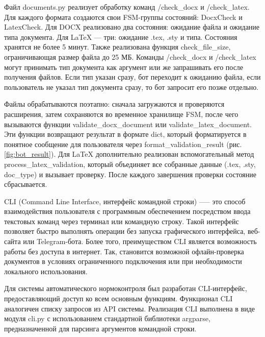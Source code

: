 \documentclass{report}
\begin{document}
Файл documents.py реализует обработку команд /check\_docx и /check\_latex. Для каждого формата создаются свои FSM-группы состояний: DocxCheck и LatexCheck. Для DOCX реализовано два состояния: ожидание файла и ожидание типа документа. Для LaTeX — три: ожидание .tex, .sty и типа. Состояния хранятся не более 5 минут. Также реализована функция check\_file\_size, ограничивающая размер файла до 25 МБ. Команды /check\_docx и /check\_latex могут принимать тип документа как аргумент или же запрашивать его после получения файлов. Если тип указан сразу, бот переходит к ожиданию файла, если пользователь не указал тип документа сразу, то бот запросит его позже отдельно.

Файлы обрабатываются поэтапно: сначала загружаются и проверяются расширения, затем сохраняются во временное хранилище FSM, после чего вызываются функции validate\_docx\_document или validate\_latex\_document. Эти функции возвращают результат в формате dict, который форматируется в понятное сообщение для пользователя через format\_validation\_result (рис. \ref{fig:bot_result}). Для LaTeX дополнительно реализован вспомогательный метод process\_latex\_validation, который объединяет все собранные данные (.tex, .sty, doc\_type) и вызывает проверку. После каждого завершения проверки состояние сбрасывается.



CLI (Command Line Interface, интерфейс командной строки) —-- это способ взаимодействия пользователя с программным обеспечением посредством ввода текстовых команд через терминал или командную строку. Такой интерфейс позволяет быстро выполнять операции без запуска графического интерфейса, веб-сайта или Telegram-бота. Более того, преимуществом CLI является возможность работы без доступа в интернет. Так, становится возможной офлайн-проверка документов в условиях ограниченного подключения или при необходимости локального использования.

Для системы автоматического нормоконтроля был разработан CLI-интерфейс, предоставляющий доступ ко всем основным функциям. Функционал CLI аналогичен списку запросов из API системы. Реализация CLI выполнена в виде модуля cli.py с использованием стандартной библиотеки argparse, предназначенной для парсинга аргументов командной строки.
\end{document}
